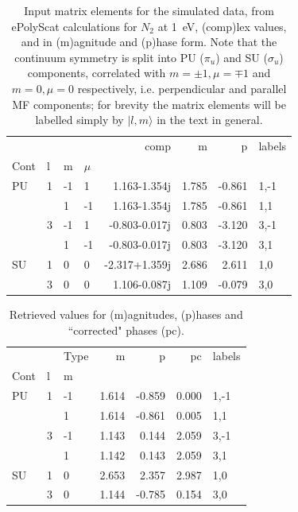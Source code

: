 \documentclass[10pt]{article}
\begin{document}
\begin{table}
\centering
\begin{tabular}{llllrrrl}
\toprule
   &   &    &    &          comp &     m &      p & labels \\
Cont & l & m & $\mu$ &               &       &        &        \\
\midrule
PU & 1 & -1 &  1 &  1.163-1.354j & 1.785 & -0.861 &   1,-1 \\
   &   &  1 & -1 &  1.163-1.354j & 1.785 & -0.861 &    1,1 \\
   & 3 & -1 &  1 & -0.803-0.017j & 0.803 & -3.120 &   3,-1 \\
   &   &  1 & -1 & -0.803-0.017j & 0.803 & -3.120 &    3,1 \\
SU & 1 &  0 &  0 & -2.317+1.359j & 2.686 &  2.611 &    1,0 \\
   & 3 &  0 &  0 &  1.106-0.087j & 1.109 & -0.079 &    3,0 \\
\bottomrule
\end{tabular}

\caption{\label{tab:inputMatE}Input matrix elements for the simulated data, from ePolyScat calculations for $N_2$ at 1~eV, (comp)lex values, and in (m)agnitude and (p)hase form. Note that the continuum symmetry is split into PU ($\pi_u$) and SU ($\sigma_u$) components, correlated with $m=\pm1,\mu=\mp1$ and $m=0,\mu=0$ respectively, i.e. perpendicular and parallel MF components; for brevity the matrix elements will be labelled simply by $|l,m\rangle$ in the text in general.}
\end{table}
\begin{table}
\centering
\begin{tabular}{lllrrrl}
\toprule
   &   & Type &     m &      p &    pc & labels \\
Cont & l & m &       &        &       &        \\
\midrule
PU & 1 & -1 & 1.614 & -0.859 & 0.000 &   1,-1 \\
   &   &  1 & 1.614 & -0.861 & 0.005 &    1,1 \\
   & 3 & -1 & 1.143 &  0.144 & 2.059 &   3,-1 \\
   &   &  1 & 1.142 &  0.143 & 2.059 &    3,1 \\
SU & 1 &  0 & 2.653 &  2.357 & 2.987 &    1,0 \\
   & 3 &  0 & 1.144 & -0.785 & 0.154 &    3,0 \\
\bottomrule
\end{tabular}

\caption{\label{tab:aggMatE}Retrieved values for (m)agnitudes, (p)hases and ``corrected" phases (pc).}
\end{table}
\end{document}
